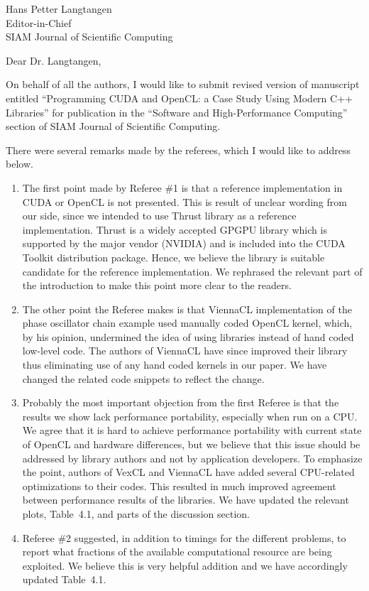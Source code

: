 \documentclass[a4paper,11pt]{letter}
\begin{document}
\begin{letter}{
    Hans Petter Langtangen\\
    Editor-in-Chief\\
    SIAM Journal of Scientific Computing
    }
\opening{Dear Dr. Langtangen,}

On behalf of all the authors, I would like to submit revised version of
manuscript entitled ``Programming CUDA and OpenCL: a Case Study Using Modern
C++ Libraries'' for publication in the ``Software and High-Performance
Computing'' section of SIAM Journal of Scientific Computing.

There were several remarks made by the referees, which I would like to address
below.

\begin{enumerate}
    \item The first point made by Referee \#1 is that a reference
        implementation in CUDA or OpenCL is not presented. This is result of
        unclear wording from our side, since we intended to use Thrust library
        as a reference implementation. Thrust is a widely accepted GPGPU
        library which is supported by the major vendor (NVIDIA) and is included
        into the CUDA Toolkit distribution package. Hence, we believe the
        library is suitable candidate for the reference implementation. We
        rephrased the relevant part of the introduction to make this point more
        clear to the readers.
    \item The other point the Referee makes is that ViennaCL implementation of
        the phase oscillator chain example used manually coded OpenCL kernel,
        which, by his opinion, undermined the idea of using libraries instead
        of hand coded low-level code. The authors of ViennaCL have since
        improved their library thus eliminating use of any hand coded kernels
        in our paper. We have changed the related code snippets to reflect the
        change.
    \item Probably the most important objection from the first Referee is that
        the results we show lack performance portability, especially when run on
        a CPU. We agree that it is hard to achieve performance portability with
        current state of OpenCL and hardware differences, but we believe that
        this issue should be addressed by library authors and not by
        application developers. To emphasize the point, authors of
        VexCL and ViennaCL %
        have added several CPU-related optimizations to their codes.
        This resulted in much improved agreement between performance results of
        the libraries. We have updated the relevant plots, Table~4.1, and parts
        of the discussion section.
    \item Referee \#2 suggested, in addition to timings for the different
        problems, to report what fractions of the available computational
        resource are being exploited. We believe this is very helpful addition
        and we have accordingly updated Table~4.1.
\end{enumerate}


\end{letter}
\end{document}
